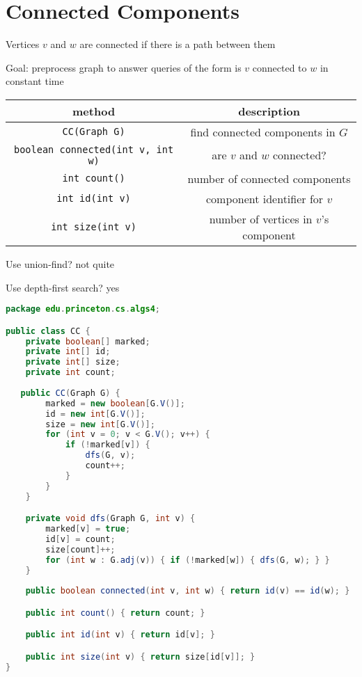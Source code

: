 \documentclass[8pt,a4paper,compress]{beamer}
\begin{document}
\section{Connected Components}
\begin{frame}[fragile]
\pause

Vertices $v$ and $w$ are connected if there is a path between them

\pause
\bigskip

Goal: preprocess graph to answer queries of the form is $v$ connected to $w$ in constant time

\begin{center}
\begin{tabular}{cc}
method & description \\ \hline
\lstinline$CC(Graph G)$ & find connected components in $G$ \\
\lstinline$boolean connected(int v, int w)$ & are $v$ and $w$ connected? \\
\lstinline$int count()$ & number of connected components \\
\lstinline$int id(int v)$ & component identifier for $v$ \\
\lstinline$int size(int v)$ & number of vertices in $v$'s component
\end{tabular} 
\end{center}

\pause
\bigskip

Use union-find? not quite

\pause
\bigskip

Use depth-first search? yes
\end{frame}

\begin{frame}[fragile]
\pause

\begin{lstlisting}[language=Java]
package edu.princeton.cs.algs4;

public class CC {
    private boolean[] marked; 
    private int[] id; 
    private int[] size;  
    private int count;  
    
   public CC(Graph G) {
        marked = new boolean[G.V()];
        id = new int[G.V()];
        size = new int[G.V()];
        for (int v = 0; v < G.V(); v++) {
            if (!marked[v]) {
                dfs(G, v);
                count++;
            }
        }
    }

    private void dfs(Graph G, int v) {
        marked[v] = true;
        id[v] = count;
        size[count]++;
        for (int w : G.adj(v)) { if (!marked[w]) { dfs(G, w); } }
    }
    
    public boolean connected(int v, int w) { return id(v) == id(w); }

    public int count() { return count; }

    public int id(int v) { return id[v]; }

    public int size(int v) { return size[id[v]]; }
}
\end{lstlisting} 
\end{frame}
\end{document}
